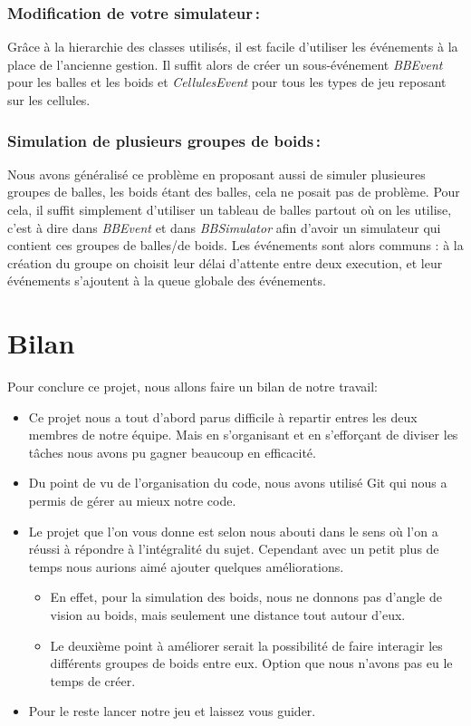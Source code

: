 \documentclass[a4paper, 10pt, french]{article}
\begin{document}
    \subsubsection{Modification de votre simulateur\,: } 
      {
          \indent Grâce à la hierarchie des classes utilisés, il est facile d'utiliser les événements à la place de l'ancienne gestion. Il suffit alors de créer un sous-événement {\em BBEvent} pour les balles et les boids et {\em CellulesEvent} pour tous les types de jeu reposant sur les cellules.
      }
      \subsubsection{Simulation de plusieurs groupes de boids\,: } 
      {
          \indent Nous avons généralisé ce problème en proposant aussi de simuler plusieures groupes de balles, les boids étant des balles, cela ne posait pas de problème. Pour cela, il suffit simplement d'utiliser un tableau de balles partout où on les utilise, c'est à dire dans {\em BBEvent} et dans {\em BBSimulator} afin d'avoir un simulateur qui contient ces groupes de balles/de boids. Les événements sont alors communs : à la création du groupe on choisit leur délai d'attente entre deux execution, et leur événements s'ajoutent à la queue globale des événements.
      }

\section{Bilan}
{
Pour conclure ce projet, nous allons faire un bilan de notre travail: 
\begin{itemize}
		\item Ce projet nous a tout d'abord parus difficile à repartir entres les deux membres de notre équipe. Mais en s'organisant et en s'efforçant de diviser les tâches nous avons pu gagner beaucoup en efficacité.
		\item Du point de vu de l'organisation du code, nous avons utilisé Git qui nous a permis de gérer au mieux notre code.
		\item Le projet que l'on vous donne est selon nous abouti dans le sens où l'on a réussi à répondre à l'intégralité du sujet. Cependant avec un petit plus de temps nous aurions aimé ajouter quelques améliorations. 
		\begin{itemize}
			\item En effet, pour la simulation des boids, nous ne donnons pas d'angle de vision au boids, mais seulement une distance tout autour d'eux.
			\item Le deuxième point à améliorer serait la possibilité de faire interagir les différents groupes de boids entre eux. Option que nous n'avons pas eu le temps de créer. 
		\end{itemize}
		\item Pour le reste lancer notre jeu et laissez vous guider.
		\end{itemize}
}
\end{document}
